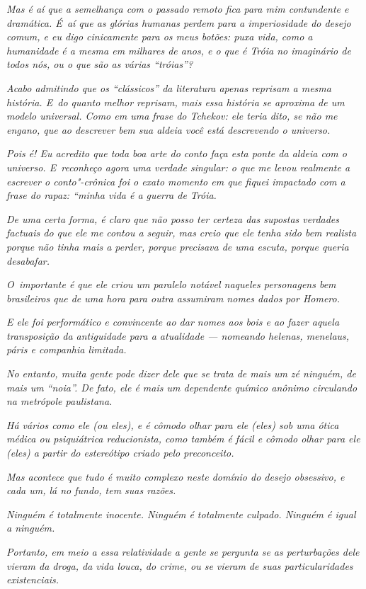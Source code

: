 \emph{Mas é aí que a semelhança com o passado remoto fica para mim
contundente e dramática. É~aí que as glórias humanas perdem para a
imperiosidade do desejo comum, e eu digo cinicamente para os meus
botões: puxa vida, como a humanidade é a mesma em milhares de anos, e o
que é Tróia no imaginário de todos nós, ou o que são as várias
``tróias''?}~

\emph{Acabo admitindo que os ``clássicos'' da literatura apenas reprisam
a mesma história. E~do quanto melhor reprisam, mais essa história se
aproxima de um modelo universal. Como em uma frase do Tchekov: ele teria
dito, se não me engano, que ao descrever bem sua aldeia você está
descrevendo o universo.}~

\emph{Pois é! Eu acredito que toda boa arte do conto faça esta ponte da
aldeia com o universo. E~reconheço agora uma verdade singular: o que me
levou realmente a escrever o conto"-crônica foi o exato momento em que
fiquei impactado com a frase do rapaz: ``minha vida é a guerra de
Tróia.}~

\emph{De uma certa forma, é claro que não posso ter certeza das supostas
verdades factuais do que ele me contou a seguir, mas creio que ele tenha
sido bem realista porque não tinha mais a perder, porque precisava de
uma escuta, porque queria desabafar.}~

\emph{O~importante é que ele criou um paralelo notável naqueles
personagens bem brasileiros que de uma hora para outra assumiram nomes
dados por Homero.}~

\emph{E ele foi performático e convincente ao dar nomes aos bois e ao
fazer aquela transposição da antiguidade para a atualidade --- nomeando
helenas, menelaus, páris e companhia limitada.}~

\emph{No entanto, muita gente pode dizer dele que se trata de mais um zé
ninguém, de mais um ``noia''. De fato, ele é mais um dependente químico
anônimo circulando na metrópole paulistana.}~

\emph{Há vários como ele (ou eles), e é cômodo olhar para ele (eles) sob
uma ótica médica ou psiquiátrica reducionista, como também é fácil e
cômodo olhar para ele (eles) a partir do estereótipo criado pelo
preconceito.}~

\emph{Mas acontece que tudo é muito complexo neste domínio do desejo
obsessivo, e cada um, lá no fundo, tem suas razões.}~

\emph{Ninguém é totalmente inocente. Ninguém é totalmente culpado.
Ninguém é igual a ninguém.}~

\emph{Portanto, em meio a essa relatividade a gente se pergunta se as
perturbações dele vieram da droga, da vida louca, do crime, ou se vieram
de suas particularidades existenciais.}~

